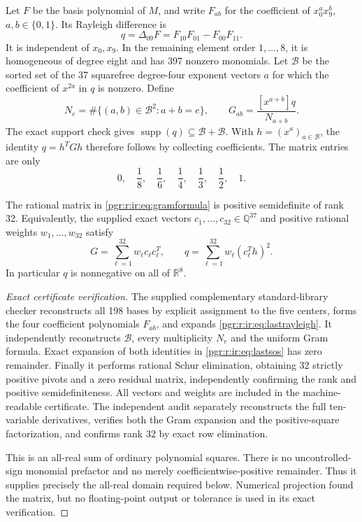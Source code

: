 \documentclass[11pt]{article}
\numberwithin{equation}{section}
\theoremstyle{definition}\newtheorem{definition}[theorem]{Definition}\newtheorem{remark}[theorem]{Remark}
\begin{document}
Let $F$ be the basis polynomial of $M$, and write $F_{ab}$ for the coefficient of $x_0^a x_9^b$, $a,b\in\{0,1\}$. Its Rayleigh difference is
\begin{equation}\label{pgr:r:ir:eq:lastrayleigh}
 q=\Delta_{09}F=F_{10}F_{01}-F_{00}F_{11}.
\end{equation}
It is independent of $x_0,x_9$. In the remaining element order $1,\ldots,8$, it is homogeneous of degree eight and has 397 nonzero monomials. Let $\mathcal B$ be the sorted set of the 37 squarefree degree-four exponent vectors $a$ for which the coefficient of $x^{2a}$ in $q$ is nonzero. Define
\begin{equation}\label{pgr:r:ir:eq:gramformula}
 N_e=\#\{(a,b)\in\mathcal B^2:a+b=e\},
 \qquad G_{ab}=\frac{[x^{a+b}]q}{N_{a+b}}.
\end{equation}
The exact support check gives $\operatorname{supp}(q)\subseteq\mathcal B+\mathcal B$. With $h=(x^a)_{a\in\mathcal B}$, the identity $q=h^TGh$ therefore follows by collecting coefficients. The matrix entries are only
\[
 0,\quad \frac18,\quad\frac16,\quad\frac14,\quad\frac13,\quad\frac12,\quad1.
\]

\begin{lemma}\label{pgr:r:ir:lem:lastgram}
The rational matrix in \eqref{pgr:r:ir:eq:gramformula} is positive semidefinite of rank 32. Equivalently, the supplied exact vectors $c_1,\ldots,c_{32}\in\mathbb Q^{37}$ and positive rational weights $w_1,\ldots,w_{32}$ satisfy
\begin{equation}\label{pgr:r:ir:eq:lastsos}
 G=\sum_{\ell=1}^{32}w_\ell c_\ell c_\ell^T,
 \qquad q=\sum_{\ell=1}^{32}w_\ell(c_\ell^T h)^2.
\end{equation}
In particular $q$ is nonnegative on all of $\mathbb R^8$.
\end{lemma}
\begin{proof}[Exact certificate verification]
The supplied complementary standard-library checker reconstructs all 198 bases by explicit assignment to the five centers, forms the four coefficient polynomials $F_{ab}$, and expands \eqref{pgr:r:ir:eq:lastrayleigh}. It independently reconstructs $\mathcal B$, every multiplicity $N_e$ and the uniform Gram formula. Exact expansion of both identities in \eqref{pgr:r:ir:eq:lastsos} has zero remainder. Finally it performs rational Schur elimination, obtaining 32 strictly positive pivots and a zero residual matrix, independently confirming the rank and positive semidefiniteness. All vectors and weights are included in the machine-readable certificate. The independent audit separately reconstructs the full ten-variable derivatives, verifies both the Gram expansion and the positive-square factorization, and confirms rank 32 by exact row elimination.

This is an all-real sum of ordinary polynomial squares. There is no uncontrolled-sign monomial prefactor and no merely coefficientwise-positive remainder. Thus it supplies precisely the all-real domain required below. Numerical projection found the matrix, but no floating-point output or tolerance is used in its exact verification.
\end{proof}
\end{document}
